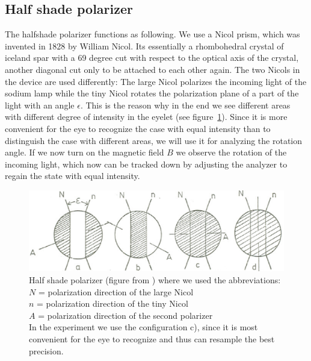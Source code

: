 \subsection{Half shade polarizer}
The halfshade polarizer functions as following. We use a Nicol prism, which was invented in
1828 by William Nicol. Its essentially a rhombohedral crystal of iceland spar with a 69 degree cut with
respect to the optical axis of the crystal, another diagonal cut only to be attached to each
other again. The two Nicols in the device are used differently: The large Nicol polarizes the
incoming light of the sodium lamp while the tiny Nicol rotates the polarization plane of 
a part of the light with an angle $\epsilon$. This is the reason why in the end we see different
areas with different degree of intensity in the eyelet (see figure~\ref{fig:halfshadepolarizer}).
Since it is more convenient for the eye to recognize the case with equal intensity than to
distinguish the case with different areas, we will use it for analyzing the rotation angle.
If we now turn on the magnetic field $B$ we observe the rotation of the incoming light, which
now can be tracked down by adjusting the analyzer to regain the state with equal intensity.
\begin{figure}
    \begin{centering}
        \includegraphics[width=14cm]{figures/halfshadepolarizer}
        \caption{Half shade polarizer (figure from \cite{staatsexamen}) where we used the
            abbreviations: \\
            $N$ = polarization direction of the large Nicol\\
            $n$ = polarization direction of the tiny Nicol\\
            $A$ = polarization direction of the second polarizer\\
            In the experiment we use the configuration c), since it is most convenient
            for the eye to recognize and thus can resample the best precision.
            }
        \label{fig:halfshadepolarizer}
    \end{centering}
\end{figure}
